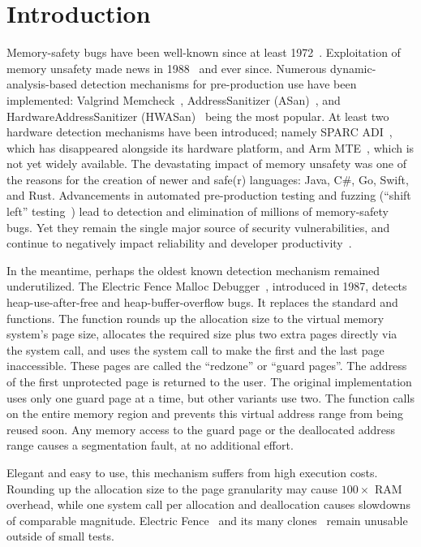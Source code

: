 \section{Introduction}

Memory-safety bugs have been well-known since at least
1972~\cite{Anderson1972}.  Exploitation of memory unsafety made news in
1988~\cite{Orman2003} and ever since.  Numerous dynamic-analysis-based
detection mechanisms for pre-production use have been implemented: Valgrind
Memcheck~\cite{NethercoteS2007}, AddressSanitizer
(ASan)~\cite{SerebryanyBPV2012}, and HardwareAddressSanitizer
(HWASan)~\cite{SerebryanySSTV2018} being the most popular. At least two
hardware detection mechanisms have been introduced; namely SPARC
ADI~\cite{AingaranJKLLMPR2015}, which has disappeared alongside its hardware
platform, and Arm MTE~\cite{Serebryany2019}, which is not yet widely available.
The devastating impact of memory unsafety was one of the reasons for the
creation of newer and safe(r) languages: Java, C\#, Go, Swift, and Rust.
Advancements in automated pre-production testing and fuzzing (``shift left''
testing~\cite{Smith2001}) lead to detection and elimination of millions of
memory-safety bugs.  Yet they remain the single major source of security
vulnerabilities, and continue to negatively impact reliability and developer
productivity~\cite{SzekeresPWS2013, Gaynor2020}.

In the meantime, perhaps the oldest known detection mechanism remained
underutilized. The Electric Fence Malloc Debugger~\cite{EFence}, introduced in
1987, detects heap-use-after-free and heap-buffer-overflow bugs. It replaces
the standard  and  functions. The
 function rounds up the allocation size to the virtual memory
system's page size, allocates the required size plus two extra pages directly
via the  system call, and uses the  system
call to make the first and the last page inaccessible. These pages are called
the ``redzone'' or ``guard pages''. The address of the first unprotected page
is returned to the user. The original implementation uses only one guard page
at a time, but other variants use two.  The  function calls
 on the entire memory region and prevents this virtual
address range from being reused soon. Any memory access to the guard page or
the deallocated address range causes a segmentation fault, at no additional
effort.

Elegant and easy to use, this mechanism suffers from high execution costs.
Rounding up the allocation size to the page granularity may cause \(100\times\)
RAM overhead, while one system call per allocation and deallocation causes
slowdowns of comparable magnitude. Electric Fence~\cite{EFence} and its many
clones~\cite{PageHeap} remain unusable outside of small tests.

